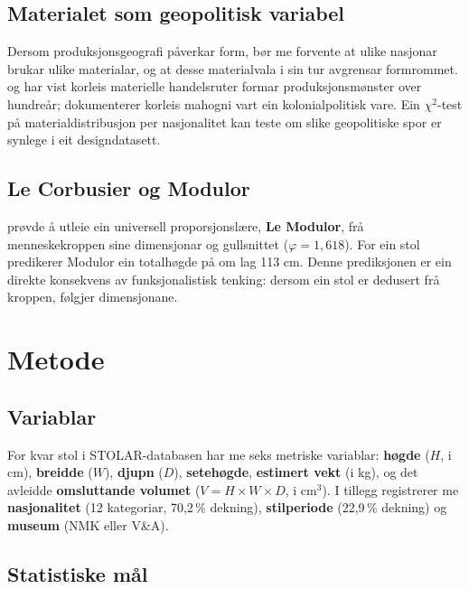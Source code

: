 \documentclass[10pt, a4paper, twocolumn]{article}
\begin{document}
\subsection{Materialet som geopolitisk variabel}

Dersom produksjonsgeografi påverkar form, bør me forvente at ulike nasjonar brukar ulike materialar, og at desse materialvala i sin tur avgrensar formrommet. \citet{braudel1979} og \citet{wallerstein2004} har vist korleis materielle handelsruter formar produksjonsmønster over hundreår; \citet{anderson2012} dokumenterer korleis mahogni vart ein kolonialpolitisk vare. Ein $\chi^2$-test på materialdistribusjon per nasjonalitet kan teste om slike geopolitiske spor er synlege i eit designdatasett.

\subsection{Le Corbusier og Modulor}

\citet{lecorbusier1950} prøvde å utleie ein universell proporsjonslære, \textbf{Le Modulor}, frå menneskekroppen sine dimensjonar og gullsnittet ($\varphi = 1{,}618$). For ein stol predikerer Modulor ein totalhøgde på om lag 113 cm. Denne prediksjonen er ein direkte konsekvens av funksjonalistisk tenking: dersom ein stol er dedusert frå kroppen, følgjer dimensjonane.


\section{Metode}

\subsection{Variablar}

For kvar stol i STOLAR-databasen har me seks metriske variablar: \textbf{høgde} ($H$, i cm), \textbf{breidde} ($W$), \textbf{djupn} ($D$), \textbf{setehøgde}, \textbf{estimert vekt} (i kg), og det avleidde \textbf{omsluttande volumet} ($V = H \times W \times D$, i cm$^3$). I tillegg registrerer me \textbf{nasjonalitet} (12 kategoriar, 70,2\,\% dekning), \textbf{stilperiode} (22,9\,\% dekning) og \textbf{museum} (NMK eller V\&A).

\subsection{Statistiske mål}
\end{document}
